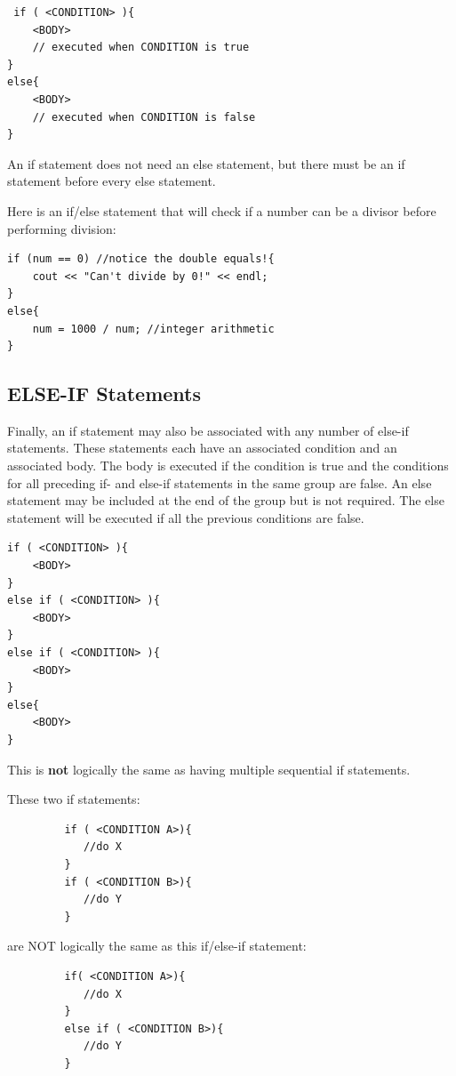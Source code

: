  \begin{verbatim}
 if ( <CONDITION> ){
	<BODY>
    // executed when CONDITION is true
}
else{
	<BODY>
    // executed when CONDITION is false
}
 \end{verbatim}

 An if statement does not need an else statement, but there must be an if statement before every else statement.

 \begin{example}
     Here is an if/else statement that will check if a number can be a divisor before performing division:
     \begin{verbatim}
if (num == 0) //notice the double equals!{
	cout << "Can't divide by 0!" << endl;
}
else{
	num = 1000 / num; //integer arithmetic
}         
     \end{verbatim}
 \end{example}

 \subsection{ELSE-IF Statements}
 
 Finally, an if statement may also be associated with any number of else-if statements. These statements each have an associated condition and an associated body. The body is executed if the condition is true and the conditions for all preceding if- and else-if statements in the same group are false. An else statement may be included at the end of the group but is not required. The else statement will be executed if all the previous conditions are false.

\begin{verbatim}
if ( <CONDITION> ){
	<BODY>
}
else if ( <CONDITION> ){
	<BODY>
}
else if ( <CONDITION> ){
	<BODY>
}
else{
	<BODY>
}
 \end{verbatim}

 This is \textbf{not} logically the same as having multiple sequential if statements. 

 \begin{example}
     These two if statements:
     \begin{verbatim}
         if ( <CONDITION A>){
            //do X
         }
         if ( <CONDITION B>){
            //do Y
         }
     \end{verbatim}
     are NOT logically the same as this if/else-if statement:
     \begin{verbatim}
         if( <CONDITION A>){
            //do X
         }
         else if ( <CONDITION B>){
            //do Y
         }
     \end{verbatim}
 \end{example}

